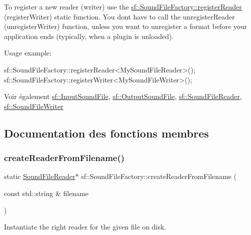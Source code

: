 To register a new reader (writer) use the \hyperlink{classsf_1_1SoundFileFactory_acaf1f0bf1b7c7b9988ec76b33e33fe95}{sf\+::\+Sound\+File\+Factory\+::register\+Reader} (register\+Writer) static function. You don\textquotesingle{}t have to call the unregister\+Reader (unregister\+Writer) function, unless you want to unregister a format before your application ends (typically, when a plugin is unloaded).

Usage example\+: 
\begin{DoxyCode}
sf::SoundFileFactory::registerReader<MySoundFileReader>();
sf::SoundFileFactory::registerWriter<MySoundFileWriter>();
\end{DoxyCode}


\begin{DoxySeeAlso}{Voir également}
\hyperlink{classsf_1_1InputSoundFile}{sf\+::\+Input\+Sound\+File}, \hyperlink{classsf_1_1OutputSoundFile}{sf\+::\+Output\+Sound\+File}, \hyperlink{classsf_1_1SoundFileReader}{sf\+::\+Sound\+File\+Reader}, \hyperlink{classsf_1_1SoundFileWriter}{sf\+::\+Sound\+File\+Writer} 
\end{DoxySeeAlso}


\subsection{Documentation des fonctions membres}
\mbox{\label{classsf_1_1SoundFileFactory_af0a87110e0b8a77aada17b22a016c066}} 
\subsubsection{\texorpdfstring{create\+Reader\+From\+Filename()}{createReaderFromFilename()}}
{\footnotesize\ttfamily static \hyperlink{classsf_1_1SoundFileReader}{Sound\+File\+Reader}$\ast$ sf\+::\+Sound\+File\+Factory\+::create\+Reader\+From\+Filename (\begin{DoxyParamCaption}\item[{const std\+::string \&}]{filename }\end{DoxyParamCaption})\hspace{0.3cm}{\ttfamily [static]}}



Instantiate the right reader for the given file on disk. 


